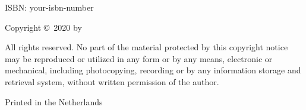 \begin{small}
\noindent ISBN: your-isbn-number\\
\smallskip{}

\noindent Copyright \copyright~2020 by \theauthor\\
\smallskip{}

\noindent All rights reserved. No part of the material protected by this copyright notice may be reproduced or utilized in any form or by any means, electronic or mechanical, including photocopying, recording or by any information storage and retrieval system, without written permission of the author.

\smallskip{}
\noindent Printed in the Netherlands

\end{small}

%





